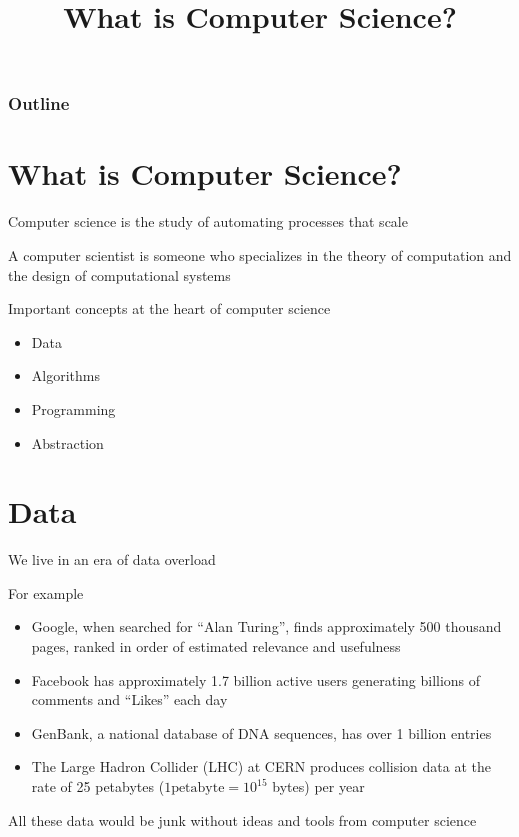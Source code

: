 \documentclass[8pt,a4paper,compress]{beamer}
\title{What is Computer Science?}
\date{}
\begin{document}
\begin{frame}
\vfill
\titlepage
\end{frame}

\begin{frame}
\frametitle{Outline}
\tableofcontents
\end{frame}

\section{What is Computer Science?}
\begin{frame}[fragile]
\pause

Computer science is the study of automating processes that scale

\pause
\bigskip

A computer scientist is someone who specializes in the theory of computation and the design of computational systems

\pause
\bigskip

Important concepts at the heart of computer science
\begin{itemize}
\item Data
\item Algorithms
\item Programming
\item Abstraction
\end{itemize}
\end{frame}

\section{Data}
\begin{frame}[fragile]
\pause

We live in an era of data overload

\pause
\bigskip

For example
\begin{itemize}
\item Google, when searched for ``Alan Turing'', finds approximately 500 thousand pages, ranked in order of estimated relevance and usefulness 
\item Facebook has approximately 1.7 billion active users generating billions of comments and ``Likes'' each day 
\item GenBank, a national database of DNA sequences, has over 1 billion entries 
\item The Large Hadron Collider (LHC) at CERN produces collision data at the rate of 25 petabytes ($1 \text{petabyte} = 10^{15}$ bytes) per year
\end{itemize}

\pause
\bigskip

All these data would be junk without ideas and tools from computer science
\end{frame}
\end{document}

